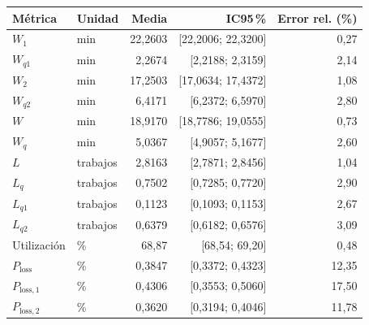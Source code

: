 \begin{tabular}{llrrr}
\toprule
Métrica & Unidad & Media & IC95\,\% & Error rel. (\%) \\
\midrule
$W_1$ & min & 22,2603 & [22,2006; 22,3200] & 0,27 \\
$W_{q1}$ & min & 2,2674 & [2,2188; 2,3159] & 2,14 \\
$W_2$ & min & 17,2503 & [17,0634; 17,4372] & 1,08 \\
$W_{q2}$ & min & 6,4171 & [6,2372; 6,5970] & 2,80 \\
$W$ & min & 18,9170 & [18,7786; 19,0555] & 0,73 \\
$W_q$ & min & 5,0367 & [4,9057; 5,1677] & 2,60 \\
$L$ & trabajos & 2,8163 & [2,7871; 2,8456] & 1,04 \\
$L_q$ & trabajos & 0,7502 & [0,7285; 0,7720] & 2,90 \\
$L_{q1}$ & trabajos & 0,1123 & [0,1093; 0,1153] & 2,67 \\
$L_{q2}$ & trabajos & 0,6379 & [0,6182; 0,6576] & 3,09 \\
Utilización & \% & 68,87 & [68,54; 69,20] & 0,48 \\
$P_{\text{loss}}$ & \% & 0,3847 & [0,3372; 0,4323] & 12,35 \\
$P_{\text{loss},1}$ & \% & 0,4306 & [0,3553; 0,5060] & 17,50 \\
$P_{\text{loss},2}$ & \% & 0,3620 & [0,3194; 0,4046] & 11,78 \\
\bottomrule
\end{tabular}
